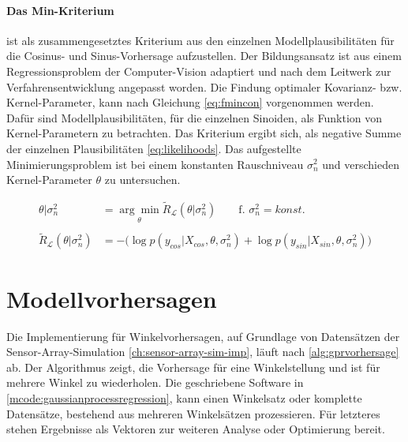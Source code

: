 \clearpage


\paragraph*{Das Min-Kriterium} ist als zusammengesetztes Kriterium aus den einzelnen Modellplausibilitäten für die Cosinus- und Sinus-Vorhersage aufzustellen. Der Bildungsansatz ist aus einem Regressionsproblem der Computer-Vision \cite{Guerrero2014} adaptiert und nach dem Leitwerk zur Verfahrensentwicklung \cite{Rasmussen2006} angepasst worden. Die Findung optimaler Kovarianz- bzw. Kernel-Parameter, kann nach Gleichung \autoref{eq:fmincon} vorgenommen werden. Dafür sind Modellplausibilitäten, für die einzelnen Sinoiden, als Funktion von Kernel-Parametern zu betrachten. Das Kriterium ergibt sich, als negative Summe der einzelnen Plausibilitäten \autoref{eq:likelihoods}. Das aufgestellte Minimierungsproblem ist bei einem konstanten Rauschniveau $\sigma_n^2$ und verschieden Kernel-Parameter $\theta$ zu untersuchen.


\begin{align}\label{eq:fmincon}
\theta|\sigma_n^2 &= \underset{\theta}{\arg\min} \tilde{R}_{\mathcal{L}}(\theta|\sigma_n^2) \qquad \text{f. } \sigma_n^2 = konst. \nonumber \\
\\
\tilde{R}_{\mathcal{L}}(\theta|\sigma_n^2) &= -\big( \log p(y_{cos}|X_{cos}, \theta, \sigma_n^2) + \log p(y_{sin}|X_{sin}, \theta, \sigma_n^2) \big) \nonumber
\end{align}


\clearpage


\section{Modellvorhersagen}\label{sec:gprpred}


Die Implementierung für Winkelvorhersagen, auf Grundlage von Datensätzen der Sensor-Array-Simulation \autoref{ch:sensor-array-sim-imp}, läuft nach \autoref{alg:gprvorhersage} ab. Der Algorithmus zeigt, die Vorhersage für eine Winkelstellung und ist für mehrere Winkel zu wiederholen. Die geschriebene Software in \autoref{mcode:gaussianprocessregression}, kann einen Winkelsatz oder komplette Datensätze, bestehend aus mehreren Winkelsätzen prozessieren. Für letzteres stehen Ergebnisse als Vektoren zur weiteren Analyse oder Optimierung bereit.


